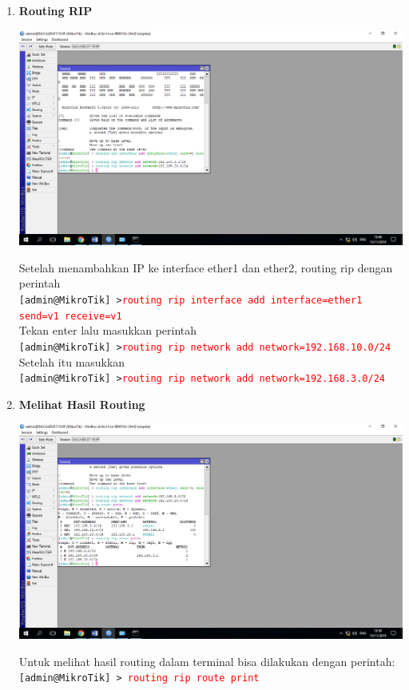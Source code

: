 \documentclass[a4paper,12pt]{article}
\begin{document}
\begin{enumerate}
	\item \textbf{Routing RIP\\}
	\begin{center}
		\includegraphics[scale=.4]{Page-3-Image-5}
	\end{center}
	Setelah menambahkan IP ke interface ether1 dan ether2, routing rip dengan perintah\\
	\texttt{[admin@MikroTik] >\textcolor{red}{routing rip interface add interface=ether1 send=v1 receive=v1}}\\
	Tekan enter lalu masukkan perintah\\
	\texttt{[admin@MikroTik] >\textcolor{red}{routing rip network add network=192.168.10.0/24}}\\
	Setelah itu masukkan\\
	\texttt{[admin@MikroTik] >\textcolor{red}{routing rip network add network=192.168.3.0/24}}
	
	\newpage
	
	\item \textbf{Melihat Hasil Routing}
	\begin{center}
		\includegraphics[scale=.4]{Page-3-Image-6}
	\end{center}
	Untuk melihat hasil routing dalam terminal bisa dilakukan dengan perintah:
	\texttt{[admin@MikroTik] > \textcolor{red}{routing rip route print}}
	

\end{enumerate}
\end{document}
